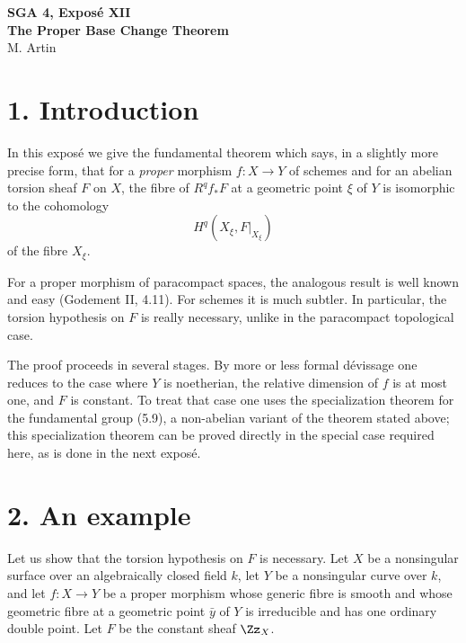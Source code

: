 
\clearpage
\begin{center}
{\Large \textbf{SGA 4, Expos\'e XII}}\\[0.35em]
{\large \textbf{The Proper Base Change Theorem}}\\[0.25em]
{\normalsize M. Artin}
\end{center}

\bigskip

\section*{1. Introduction}
In this expos\'e we give the fundamental theorem which says, in a slightly more precise form, that for a \emph{proper} morphism \(f:X\to Y\) of schemes and for an abelian torsion sheaf \(F\) on \(X\), the fibre of \(R^qf_*F\) at a geometric point \(\xi\) of \(Y\) is isomorphic to the cohomology
\[
H^q(X_\xi,F|_{X_\xi})
\]
of the fibre \(X_\xi\).

For a proper morphism of paracompact spaces, the analogous result is well known and easy (Godement II, 4.11). For schemes it is much subtler. In particular, the torsion hypothesis on \(F\) is really necessary, unlike in the paracompact topological case.

The proof proceeds in several stages. By more or less formal dévissage one reduces to the case where \(Y\) is noetherian, the relative dimension of \(f\) is at most one, and \(F\) is constant. To treat that case one uses the specialization theorem for the fundamental group (5.9), a non-abelian variant of the theorem stated above; this specialization theorem can be proved directly in the special case required here, as is done in the next expos\'e.

\section*{2. An example}
Let us show that the torsion hypothesis on \(F\) is necessary. Let \(X\) be a nonsingular surface over an algebraically closed field \(k\), let \(Y\) be a nonsingular curve over \(k\), and let \(f:X\to Y\) be a proper morphism whose generic fibre is smooth and whose geometric fibre at a geometric point \(\bar y\) of \(Y\) is irreducible and has one ordinary double point. Let \(F\) be the constant sheaf \(\Zz_X\).

